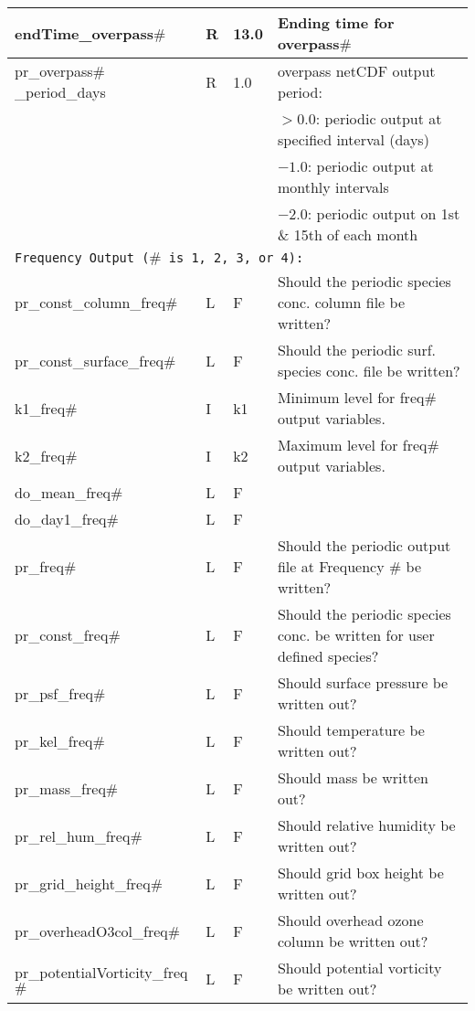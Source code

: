 {\begin{landscape}
\begin{center}
\begin{longtable}{|l|l|l|l|}
  endTime\_overpass$\#$ & R & 13.0 & Ending time for overpass$\#$ \\ \hline
  pr\_overpass$\#$\_period\_days   & R & 1.0 & overpass netCDF output period:  \\
               &   &      & $>0.0$:  periodic output at specified interval (days)  \\
               &   &      & $-1.0$:  periodic output at monthly intervals  \\
               &   &      & $-2.0$:  periodic output on 1st \& 15th of each month  \\ \hline
\multicolumn{4}{|l|}{\tt Frequency Output ($\#$ is 1, 2, 3, or 4):} \\ \hline
  pr\_const\_column\_freq$\#$   & L & F & Should the periodic species conc. column file be written?  \\ \hline
  pr\_const\_surface\_freq$\#$   & L & F & Should the periodic surf. species conc. file be written?  \\ \hline
  k1\_freq$\#$   & I & k1 & Minimum level for freq$\#$ output variables.  \\ \hline
  k2\_freq$\#$   & I & k2 & Maximum level for freq$\#$ output variables.  \\ \hline
  do\_mean\_freq$\#$   & L & F &   \\ \hline
  do\_day1\_freq$\#$   & L & F &   \\ \hline
  pr\_freq$\#$   & L & F & Should the periodic output file at Frequency $\#$ be written?  \\ \hline
  pr\_const\_freq$\#$   & L & F & Should the periodic species conc. be written for user defined species?  \\ \hline
  pr\_psf\_freq$\#$   & L & F & Should surface pressure be written out?  \\ \hline
  pr\_kel\_freq$\#$   & L & F & Should temperature be written out?  \\ \hline
  pr\_mass\_freq$\#$   & L & F & Should mass be written out?  \\ \hline
  pr\_rel\_hum\_freq$\#$   & L & F & Should relative humidity be written out?  \\ \hline
  pr\_grid\_height\_freq$\#$   & L & F & Should grid box height be written out?  \\ \hline
  pr\_overheadO3col\_freq$\#$   & L & F & Should overhead ozone column be written out?  \\ \hline
  pr\_potentialVorticity\_freq$\#$   & L & F & Should potential vorticity be written out?  \\ \hline

\end{longtable}
\end{center}
\end{landscape}}

